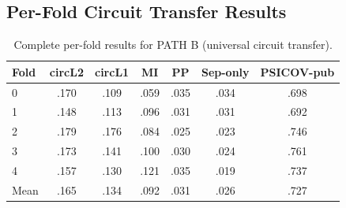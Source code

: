 \subsection{Per-Fold Circuit Transfer Results}
\begin{table}[ht]
	\centering
	\caption{Complete per-fold results for PATH B (universal circuit transfer).}
	\label{tab:per-fold}
	\begin{tabular}{lcccccc}
		\toprule
		Fold & circL2 & circL1 & MI   & PP   & Sep-only & PSICOV-pub \\
		\midrule
		0    & .170   & .109   & .059 & .035 & .034     & .698       \\
		1    & .148   & .113   & .096 & .031 & .031     & .692       \\
		2    & .179   & .176   & .084 & .025 & .023     & .746       \\
		3    & .173   & .141   & .100 & .030 & .024     & .761       \\
		4    & .157   & .130   & .121 & .035 & .019     & .737       \\
		\midrule
		Mean & .165   & .134   & .092 & .031 & .026     & .727       \\
		\bottomrule
	\end{tabular}
\end{table}
